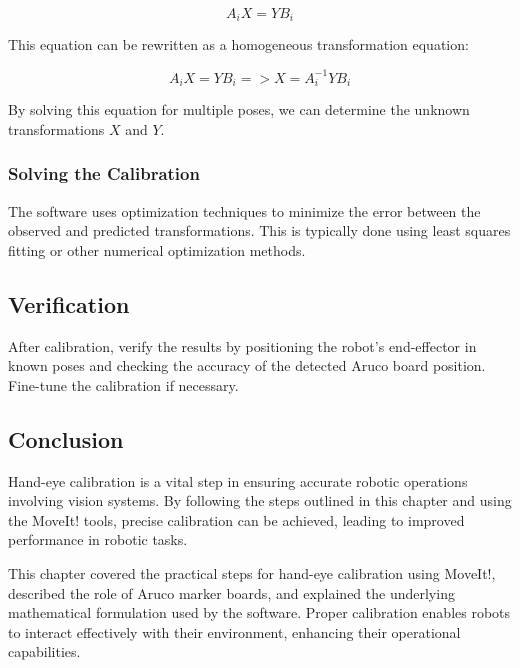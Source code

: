 \begin{equation}
A_i X = Y B_i
\end{equation}

This equation can be rewritten as a homogeneous transformation equation:

\begin{equation}
A_i X = Y B_i => X = A_i^{-1} Y B_i
\end{equation}

By solving this equation for multiple poses, we can determine the unknown transformations \( X \) and \( Y \).

\subsubsection{Solving the Calibration}
The software uses optimization techniques to minimize the error between the observed and predicted transformations. This is typically done using least squares fitting or other numerical optimization methods.

\subsection{Verification}
After calibration, verify the results by positioning the robot’s end-effector in known poses and checking the accuracy of the detected Aruco board position. Fine-tune the calibration if necessary.

\subsection{Conclusion}
Hand-eye calibration is a vital step in ensuring accurate robotic operations involving vision systems. By following the steps outlined in this chapter and using the MoveIt! tools, precise calibration can be achieved, leading to improved performance in robotic tasks.

This chapter covered the practical steps for hand-eye calibration using MoveIt!, described the role of Aruco marker boards, and explained the underlying mathematical formulation used by the software. Proper calibration enables robots to interact effectively with their environment, enhancing their operational capabilities.